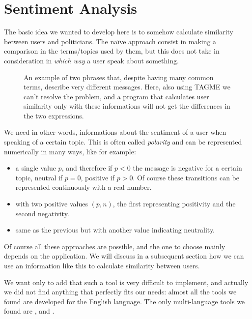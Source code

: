 \documentclass[a4paper,11pt,oneside]{article}
\begin{document}
\section{Sentiment Analysis}
\label{sec:sentiment}
The basic idea we wanted to develop here is to somehow calculate similarity between users and politicians. The na\"ive approach consist in making a comparison in the terms/topics used by them, but this does not take in consideration in \textit{which way} a user speak about something.

\begin{figure}[h]
\caption{An example of two phrases that, despite having many common terms, describe very different messages.
Here, also using TAGME we can't resolve the problem, and a program that calculates user similarity only with these informations will not get the differences in the two expressions.}
\end{figure}

We need in other words, informations about the sentiment of a user when speaking of a certain topic. This is often called \textit{polarity} and can be represented numerically in many ways, like for example: 
\begin{itemize}
\item a single value $p$, and therefore if $p < 0$ the message is negative for a certain topic, neutral if $p = 0$, positive if $p > 0$. Of course these transitions can be represented continuously with a real number.
\item with two positive values $(p,n)$, the first representing positivity and the second negativity.
\item same as the previous but with another value indicating neutrality.
\end{itemize}

Of course all these approaches are possible, and the one to choose mainly depends on the application. We will discuss in a subsequent section how we can use an information like this to calculate similarity between users.

We want only to add that such a tool is very difficult to implement, and actually we did not find anything that perfectly fits our needs: almost all the tools we found are developed for the English language. The only multi-language tools we found are \cite{sentiment}, \cite{tromp} and \cite{Kin}.
\end{document}

